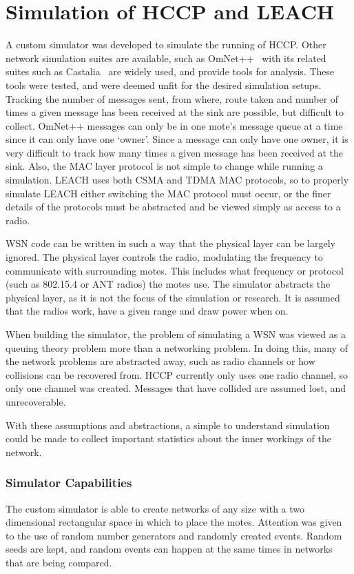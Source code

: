 \section{Simulation of HCCP and LEACH}
\label{ch:sim}


A custom simulator was developed to simulate the running of HCCP. Other network simulation suites
are available, such as OmNet++~\cite{omnet} with its related suites such as Castalia~\cite{castalia}  are
widely used, and provide tools for analysis. These tools were tested, and were deemed unfit for the 
desired simulation setups. Tracking the number of messages sent, from where, route taken and 
number of times a given message has been received at the sink are possible, but difficult to collect.
OmNet++ messages can only be in one mote's message queue at a time since it can only have one `owner'.
Since a message can only have one owner, it is very difficult to track how many times a given 
message has been received at the sink. Also, the MAC layer protocol is not simple to change while
running a simulation. LEACH uses both CSMA and TDMA MAC protocols, so to properly simulate LEACH either 
switching the MAC protocol must occur, or the finer details of the protocols must be abstracted and be viewed simply as access to a radio. 


WSN code can be written 
in such a way that the physical layer can be largely ignored. 
The physical layer controls the  radio, modulating the 
frequency to communicate with surrounding motes. This includes
what frequency or protocol (such as 802.15.4 or ANT radios) the motes use.
The simulator abstracts the physical layer, as it is not the focus of the
simulation or research. 
It is assumed that the radios work, have a given range and draw 
power when on.

When building the simulator, the problem of simulating a WSN was viewed as 
a queuing theory problem more than a networking problem. In doing this, many of 
the network problems are abstracted away, such as radio channels or how collisions can be 
recovered from. HCCP currently only uses one radio channel, so only one channel was
created. Messages that have collided are assumed lost, and unrecoverable.

With these assumptions and abstractions, a simple to understand simulation could be made 
to collect important statistics about the inner workings of the network.



\subsubsection{Simulator Capabilities}
The custom simulator is able to create networks of any size with a two dimensional rectangular space in which
to place the motes. Attention was given to the use of random number generators and 
randomly created events. Random seeds are kept, and random events can happen at the 
same times in networks that are being compared. 

